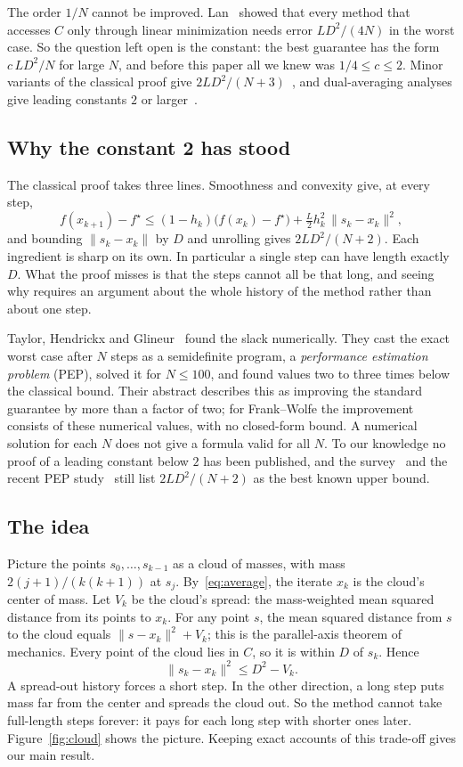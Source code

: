 \documentclass[11pt]{article}
\theoremstyle{remark}
\begin{document}
The order $1/N$ cannot be improved. Lan~\cite{Lan13} showed that every method that
accesses $C$ only through linear minimization needs error $LD^2/(4N)$ in the worst
case. So the question left open is the constant: the best guarantee has the form
$c\,LD^2/N$ for large $N$, and before this paper all we knew was
$1/4\le c\le 2$. Minor variants of the classical proof give
$2LD^2/(N+3)$~\cite{FG16,BCC22}, and dual-averaging analyses give leading
constants $2$ or larger~\cite{Bac15,Nes18}.

\subsection{Why the constant 2 has stood}

The classical proof takes three lines. Smoothness and convexity give, at every
step,
\[
  f(x_{k+1}) - f^\star \le (1-h_k)\bigl(f(x_k)-f^\star\bigr)
  + \tfrac{L}{2}h_k^2\,\|s_k-x_k\|^2 ,
\]
and bounding $\|s_k-x_k\|$ by $D$ and unrolling gives $2LD^2/(N+2)$. Each
ingredient is sharp on its own. In particular a single step can have length
exactly $D$. What the proof misses is that the steps cannot all be that long, and
seeing why requires an argument about the whole history of the method rather than
about one step.

Taylor, Hendrickx and Glineur~\cite{THG17} found the slack numerically. They cast
the exact worst case after $N$ steps as a semidefinite program, a
\emph{performance estimation problem} (PEP), solved it for $N\le100$, and found
values two to three times below the classical bound. Their abstract describes this
as improving the standard guarantee by more than a factor of two; for Frank--Wolfe
the improvement consists of these numerical values, with no closed-form bound. A
numerical solution for each $N$ does not give a formula valid for all $N$. To our
knowledge no proof of a leading constant below $2$ has been published, and the
survey~\cite{BCC22} and the recent PEP study~\cite{LG24} still list $2LD^2/(N+2)$
as the best known upper bound.

\subsection{The idea}

Picture the points $s_0,\dots,s_{k-1}$ as a cloud of masses, with mass
$2(j+1)/(k(k+1))$ at $s_j$. By~\eqref{eq:average}, the iterate $x_k$ is the cloud's
center of mass. Let $V_k$ be the cloud's spread: the mass-weighted mean squared
distance from its points to $x_k$. For any point $s$, the mean squared distance
from $s$ to the cloud equals $\|s-x_k\|^2+V_k$; this is the parallel-axis theorem
of mechanics. Every point of the cloud lies in $C$, so it is within $D$ of $s_k$.
Hence
\[
  \|s_k - x_k\|^2 \le D^2 - V_k .
\]
A spread-out history forces a short step. In the other direction, a long step puts
mass far from the center and spreads the cloud out. So the method cannot take
full-length steps forever: it pays for each long step with shorter ones later.
Figure~\ref{fig:cloud} shows the picture. Keeping exact accounts of this trade-off
gives our main result.
\end{document}
